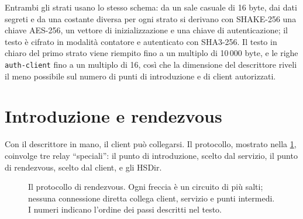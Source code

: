 Entrambi gli strati usano lo stesso schema: da un sale casuale di 16 byte, dai dati segreti e da una costante diversa per ogni strato si derivano con SHAKE-256 una chiave AES-256, un vettore di inizializzazione e una chiave di autenticazione; il testo è cifrato in modalità contatore e autenticato con SHA3-256. Il testo in chiaro del primo strato viene riempito fino a un multiplo di 10\,000 byte, e le righe \texttt{auth-client} fino a un multiplo di 16, così che la dimensione del descrittore riveli il meno possibile sul numero di punti di introduzione e di client autorizzati.

\section{Introduzione e rendezvous}\label{sec:os-rendezvous}

Con il descrittore in mano, il client può collegarsi. Il protocollo, mostrato nella \cref{fig:os-rendezvous}, coinvolge tre relay \enquote{speciali}: il punto di introduzione, scelto dal servizio, il punto di rendezvous, scelto dal client, e gli HSDir.

\begin{figure}[htbp]
\centering

\caption{Il protocollo di rendezvous. Ogni freccia è un circuito di più salti; nessuna connessione diretta collega client, servizio e punti intermedi. I numeri indicano l'ordine dei passi descritti nel testo.}
\label{fig:os-rendezvous}
\end{figure}

